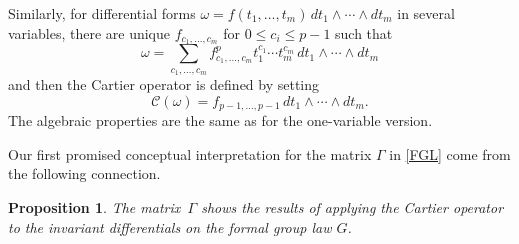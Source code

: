 \documentclass[12pt]{amsart}
\theoremstyle{theorem}
\newtheorem{prop}{Proposition}
\begin{document}
Similarly, for differential forms $\omega = f(t_1,\ldots,t_m)\, dt_1 \wedge \cdots \wedge dt_m$ in several variables,
there are unique $f_{c_1, \ldots, c_m}$ for $0 \le c_i \le p-1$ such that 
$$\omega = \sum_{c_1,\ldots, c_m} f_{c_1,\ldots,c_m}^p t_1^{c_1} \cdots t_m^{c_m}\, dt_1 \wedge \cdots \wedge dt_m$$
and then the Cartier operator is defined by setting 
$$\mathcal{C}(\omega) = f_{p-1,\ldots, p-1}\, dt_1 \wedge \cdots \wedge dt_m.$$
The algebraic properties are the same as for the one-variable version.

Our first promised conceptual interpretation for the matrix $\Gamma$ in \eqref{FGL} come from the following connection.

\begin{prop}
\label{CartierFGL}
The matrix $\,\Gamma$ shows the results of applying the Cartier operator to the 
invariant differentials on the formal group law $G$.
\end{prop}
\end{document}
